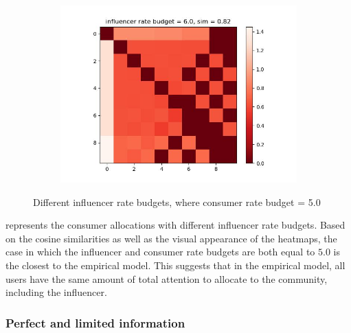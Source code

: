 \documentclass[11pt, letterpaper]{article}
\begin{document}
\begin{figure}[h]
\begin{adjustbox}{max width=1.5\textwidth,center}
\begin{subfigure}[b]{0.45\textwidth}
        \includegraphics[width=\linewidth]{"figures/M_INFL/6.0_heatmap.jpg"}
    \end{subfigure}
\end{adjustbox}
\caption{Different influencer rate budgets, where consumer rate budget = 5.0}
\label{fig:M_INFL_heatmap}
\end{figure}

 represents the consumer allocations with different influencer rate budgets. Based on the cosine similarities as well as the visual appearance of the heatmaps, the case in which the influencer and consumer rate budgets are both equal to \(5.0\) is the closest to the empirical model. This suggests that in the empirical model, all users have the same amount of total attention to allocate to the community, including the influencer. 

\subsubsection{Perfect and limited information}
\end{document}
